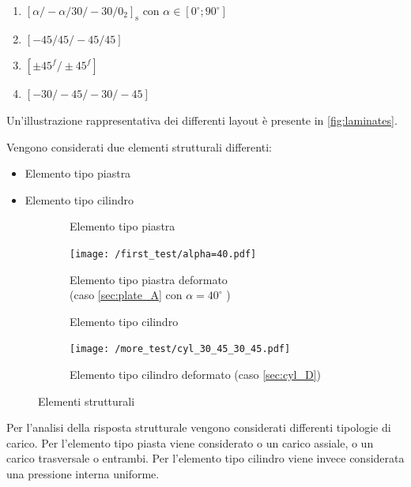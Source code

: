 \documentclass[a4paper,num-refs]{oup-contemporary}
\begin{document}
\begin{enumerate}[label=(\alph*)]
	\item $\left[\alpha /-\alpha / 30 /-30 / 0_{2}\right]_{\mathrm{s}}$ con $\alpha\in\left[0^\circ;90^\circ\right]$
	\item $\left[-45 / 45 /-45 / 45\right]$
	\item $\left[\pm 45^{f} / \pm 45^{f}\right]$
	\item $\left[-30 /-45 /-30 /-45\right]$
\end{enumerate}

Un'illustrazione rappresentativa dei differenti layout è presente in \cref{fig:laminates}.

Vengono considerati due elementi strutturali differenti:
\begin{itemize}
\item Elemento tipo piastra
\item Elemento tipo cilindro
\end{itemize}

\begin{figure}[bt!]
	\centering
	\begin{subfigure}[t]{0.24\textwidth}
		\centering
\def\svgwidth{\linewidth}

	 				\caption{Elemento tipo piastra}
		\label{fig:y equals x}
	\end{subfigure}
	\hfill
	\begin{subfigure}[t]{0.24\textwidth}
		\centering
		\texttt{[image: /first\_test/alpha=40.pdf]}
		\caption{Elemento tipo piastra deformato \\(caso \cref{sec:plate_A}  con $\alpha=40^\circ$ )}
		\label{fig:five over x}
	\end{subfigure}
	\hfill
	\begin{subfigure}[t]{0.24\textwidth}
		\centering
\def\svgwidth{\linewidth}

\caption{Elemento tipo cilindro}
		\label{fig:three sin x}
	\end{subfigure}
	\hfill
	\begin{subfigure}[t]{0.24\textwidth}
	\centering
 \texttt{[image: /more\_test/cyl\_30\_45\_30\_45.pdf]}
	\caption{Elemento tipo cilindro deformato (caso \cref{sec:cyl_D})}
	\label{fig:five ove x}
\end{subfigure}
	\hfill
	\caption{Elementi strutturali}
	\label{fig:three graphs}
\end{figure}

Per l'analisi della risposta strutturale vengono considerati differenti tipologie di carico. Per l'elemento tipo piasta viene considerato o un carico assiale, o un carico trasversale o entrambi. Per l'elemento tipo cilindro viene invece considerata una pressione interna uniforme.
\end{document}

